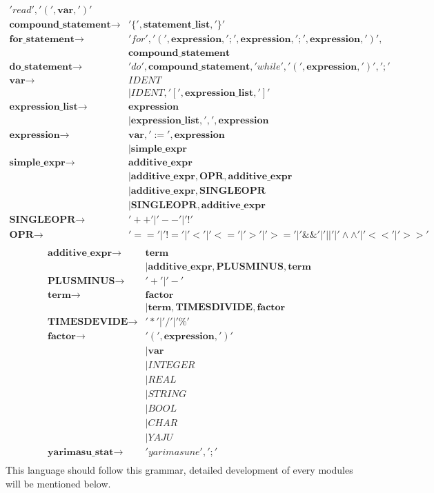 \documentclass{article}
\begin{document}
\begin{align}
	  'read','(',\textbf{var},')'\\
	  \textbf{compound\_statement} \rightarrow &
	  '\lbrace', \textbf{statement\_list}, '\rbrace'\\
	  \textbf{for\_statement} \rightarrow &
	  'for','(',\textbf{expression},';',\textbf{expression},';',\textbf{expression},')',\\ &\textbf{compound\_statement}\\
	  \textbf{do\_statement} \rightarrow &
	  'do',\textbf{compound\_statement},'while','(',\textbf{expression},')',';'\\
	  \textbf{var} \rightarrow &
	  IDENT\\
	  &|IDENT, '[',\textbf{expression\_list},']'\\
	  \textbf{expression\_list} \rightarrow &
	  \textbf{expression} \\
	  &|\textbf{expression\_list}, ',', \textbf{expression}\\
	  \textbf{expression} \rightarrow &
	  \textbf{var},':=',\textbf{expression} \\
	  &|\textbf{simple\_expr}\\
	  \textbf{simple\_expr} \rightarrow &
	  \textbf{additive\_expr} \\
	  &|\textbf{additive\_expr},\textbf{OPR},\textbf{additive\_expr}\\
	  &|\textbf{additive\_expr},\textbf{SINGLEOPR}\\
	  &|\textbf{SINGLEOPR},\textbf{additive\_expr}\\
	  \textbf{SINGLEOPR} \rightarrow &
	  '++' | '--' | '!'\\
	  \textbf{OPR} \rightarrow & 
	  '=='|'!='|'<'|'<='|'>'|'>='|'\&\&'|'||'|'\wedge\wedge'|'<<'|'>>'\\
		\end{align}
		\begin{align}
		\textbf{additive\_expr} \rightarrow &
		\textbf{term} \\
		&|\textbf{additive\_expr}, \textbf{PLUSMINUS},\textbf{term}\\
		\textbf{PLUSMINUS} \rightarrow &
		'+'|'-'\\
		\textbf{term} \rightarrow &
		\textbf{factor} \\
		&| \textbf{term},\textbf{TIMESDIVIDE},\textbf{factor}\\
		\textbf{TIMESDEVIDE} \rightarrow &
		'*'|'/'|'\%'\\
		\textbf{factor} \rightarrow &
		'(',\textbf{expression},')'\\
		&|\textbf{var}\\
		&|INTEGER \\
		&|REAL \\
		&|STRING \\
		&|BOOL\\
		&|CHAR\\
		&|YAJU\\
		\textbf{yarimasu\_stat} \rightarrow &
		'yarimasune',';'\\
		\end{align}
		This language should follow this grammar, detailed development of every modules will be mentioned below.
\end{document}
